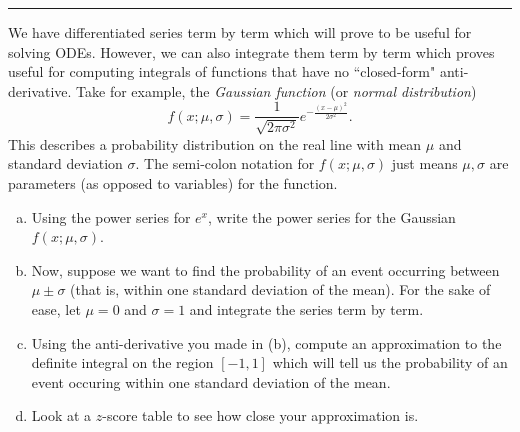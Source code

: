 \documentclass[12pt]{article} %
\begin{document}
\hrule
\begin{problem}
We have differentiated series term by term which will prove to be useful for solving ODEs.  However, we can also integrate them term by term which proves useful for computing integrals of functions that have no ``closed-form" anti-derivative.  Take for example, the \emph{Gaussian function} (or \emph{normal distribution})
\[
f(x;\mu,\sigma)=\frac{1}{\sqrt{2\pi \sigma^2}}e^{-\frac{(x-\mu)^2}{2\sigma^2}}.  
\]
This describes a probability distribution on the real line with mean $\mu$ and standard deviation $\sigma$. The semi-colon notation for $f(x;\mu,\sigma)$ just means $\mu,\sigma$ are parameters (as opposed to variables) for the function.
\begin{enumerate}[(a)]
    \item Using the power series for $e^x$, write the power series for the Gaussian $f(x;\mu,\sigma)$.
    \item Now, suppose we want to find the probability of an event occurring between $\mu \pm \sigma$ (that is, within one standard deviation of the mean).  For the sake of ease, let $\mu=0$ and $\sigma=1$ and integrate the series term by term.
    \item Using the anti-derivative you made in (b), compute an approximation to the definite integral on the region $[-1,1]$ which will tell us the probability of an event occuring within one standard deviation of the mean.
    \item Look at a $z$-score table to see how close your approximation is.
\end{enumerate}
\end{problem}
\end{document}
